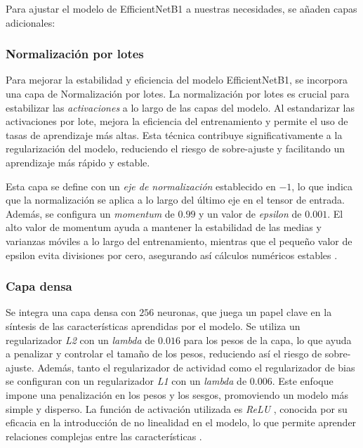 Para ajustar el modelo de EfficientNetB1 a nuestras necesidades, se añaden capas adicionales:

\subsubsection{Normalización por lotes}

Para mejorar la estabilidad y eficiencia del modelo EfficientNetB1, se incorpora una capa de Normalización por lotes. La normalización por lotes es crucial para estabilizar las \textit{activaciones} a lo largo de las capas del modelo. Al estandarizar las activaciones por lote, mejora la eficiencia del entrenamiento y permite el uso de tasas de aprendizaje más altas. Esta técnica contribuye significativamente a la regularización del modelo, reduciendo el riesgo de sobre-ajuste y facilitando un aprendizaje más rápido y estable.

Esta capa se define con un \textit{eje de normalización} establecido en $-1$, lo que indica que la normalización se aplica a lo largo del último eje en el tensor de entrada. Además, se configura un \textit{momentum} de $0.99$ y un valor de \textit{epsilon} de $0.001$. El alto valor de momentum ayuda a mantener la estabilidad de las medias y varianzas móviles a lo largo del entrenamiento, mientras que el pequeño valor de epsilon evita divisiones por cero, asegurando así cálculos numéricos estables .

\subsubsection{Capa densa}

Se integra una capa densa con $256$ neuronas, que juega un papel clave en la síntesis de las características aprendidas por el modelo. Se utiliza un regularizador \textit{L2} con un \textit{lambda} de $0.016$ para los pesos de la capa, lo que ayuda a penalizar y controlar el tamaño de los pesos, reduciendo así el riesgo de sobre-ajuste. Además, tanto el regularizador de actividad como el regularizador de bias se configuran con un regularizador \textit{L1} con un \textit{lambda} de $0.006$. Este enfoque impone una penalización en los pesos y los sesgos, promoviendo un modelo más simple y disperso. La función de activación utilizada es \textit{ReLU} , conocida por su eficacia en la introducción de no linealidad en el modelo, lo que permite aprender relaciones complejas entre las características .

